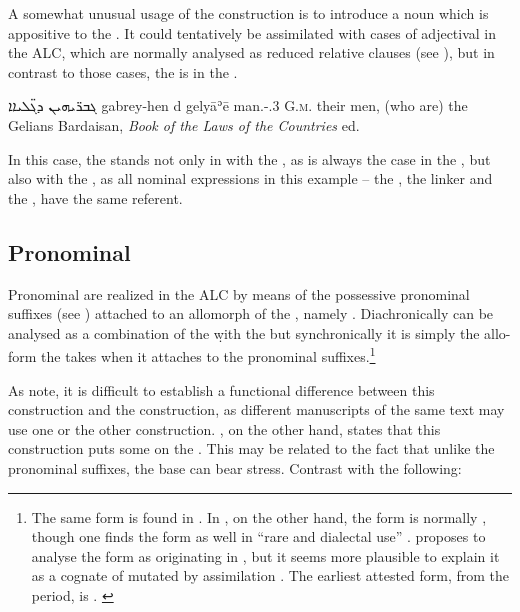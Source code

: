 {{ 
A somewhat unusual usage of the \lnk* construction is to introduce a \secn noun which is appositive to the \prim. It could tentatively be assimilated with cases of adjectival \secns in the ALC, which are normally analysed as reduced relative clauses (see ), but in contrast to those cases, the \secn is in the \emp*. 

{ܓܒܪ̈ܝܗܝܢ ܕ\hspace{-0.6ex}ܓ̈ܠܝܐܐ}
{gabrey-hen d\cb{} gelyāʾē}
{man.\pl-\poss.3\fpl{} \lnk\cb{} G.\textsc{m}.\pl}
{their men, (who are) the Gelians}
{Bardaisan, \textit{Book of the Laws of the Countries} ed.\ \cite[44:17]{Drijvers} \apud \cite[121]{BakkerBardaisan}}

\largerpage
In this case, the \lnk* stands not only in  with the \prim, as is always the case in the , but also with the \secn, as all nominal expressions in this example -- the \prim, the linker and the \secn, have the same referent. 
 
 \subsection{Pronominal \secns}
 \largerpage
 Pronominal \secns are realized in the ALC by means of the possessive pro\-nom\-inal suffixes (see ) attached to an allomorph of the \lnk*, namely . Diachronically  can be analysed as a combination of the  \lnk* \d with the   but synchronically it is simply the allo-form the \lnk* takes when it attaches to the pronominal suffixes.\footnote{The same form is found in  \CMand \citep[404, \S 260]{MacuchHandbook}. In \JBA, on the other hand, the form is normally  \citep[108]{BarAsherJBA}, though one finds the  form  as well in \enquote{rare and dialectal use} \citep[331]{SokoloffJBA}. \citet[332, fn.\ 2]{NoldekeMandaic}  proposes to analyse the form  as originating in  \citep[cf.][60]{GarbellUrmi}, but it seems more plausible to explain it as a cognate of  mutated by assimilation \citep[108]{BarAsherJBA}. The earliest attested form, from the  period, is . \label{ft:Noldeke_did}} 
 
 
 As \citet[90]{GutmanVanPeursen} note, it is difficult to establish a functional difference between this construction and the  construction, as different manuscripts of the same text may use one or the other construction.  \citet[71]{MuraokaSyriac}, on the other hand, states that this construction puts some  on the \secn. This may be related to the fact that unlike the pronominal suffixes, the base  can bear stress.  Contrast  with the following:
 
}}
